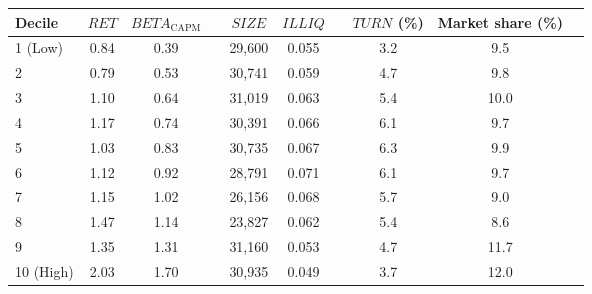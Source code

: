 \begin{tabular}{@{}lccccccccc@{}}
	\toprule
	Decile & $\textit{RET}$ & $\textit{BETA}_\textrm{CAPM}$ && $\textit{SIZE}$ & $\textit{ILLIQ}$ && $\textit{TURN}$ (\%) & Market share (\%) \\ \midrule
1 (Low) & 0.84 & 0.39 && 29,600 & 0.055 && 3.2 & 9.5 \\
2       & 0.79 & 0.53 && 30,741 & 0.059 && 4.7 & 9.8 \\
3       & 1.10 & 0.64 && 31,019 & 0.063 && 5.4 & 10.0 \\
4       & 1.17 & 0.74 && 30,391 & 0.066 && 6.1 & 9.7 \\
5       & 1.03 & 0.83 && 30,735 & 0.067 && 6.3 & 9.9 \\
6       & 1.12 & 0.92 && 28,791 & 0.071 && 6.1 & 9.7 \\
7       & 1.15 & 1.02 && 26,156 & 0.068 && 5.7 & 9.0 \\
8       & 1.47 & 1.14 && 23,827 & 0.062 && 5.4 & 8.6 \\
9       & 1.35 & 1.31 && 31,160 & 0.053 && 4.7 & 11.7 \\
10 (High) & 2.03 & 1.70 && 30,935 & 0.049 && 3.7 & 12.0 \\
	\bottomrule
\end{tabular}